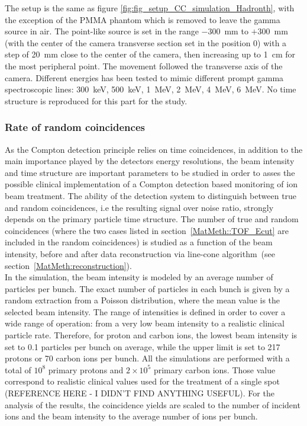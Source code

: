 The setup is the same as figure \ref{fig:fig_setup_CC_simulation_Hadronth}, with the exception of the PMMA phantom which is removed to leave the gamma source in air.
The point-like source is set in the range $-300$~mm to $+300$~mm (with the center of the camera transverse section set in the position 0) with a step of 20~mm close to the center of the camera, then increasing up to 1~cm for the most peripheral point. The movement followed the transverse axis of the camera. Different energies has been tested to mimic different prompt gamma spectroscopic lines: 300~keV, 500~keV, 1~MeV, 2~MeV, 4~MeV, 6~MeV. No time structure is reproduced for this part for the study.\newline

\subsubsection{Rate of random coincidences}

As the Compton detection principle relies on time coincidences, in addition to the main importance played by the detectors energy resolutions, the beam intensity and time structure are important parameters to be studied in order to asses the possible clinical implementation of a Compton detection based monitoring of ion beam treatment. The ability of the detection system to distinguish between true and random coincidences, i.e the resulting signal over noise ratio, strongly depends on the primary particle time structure. The number of true and random coincidences (where the two cases listed in section~\ref{MatMeth::TOF_Ecut} are included in the random coincidences) is studied as a function of the beam intensity, before and after data reconstruction via line-cone algorithm~(see section~\ref{MatMeth:reconstruction}).\\
In the simulation, the beam intensity is modeled by an average number of particles per bunch. The exact number of particles in each bunch is given by a random extraction from a Poisson distribution, where the mean value is the selected beam intensity. The range of intensities is defined in order to cover a wide range of operation: from a very low beam intensity to a realistic clinical particle rate. Therefore, for proton and carbon ions, the lowest beam intensity is set to 0.1 particles per bunch on average, while the upper limit is set to 217 protons or 70 carbon ions per bunch. All the simulations are performed with a total of $10^{8}$ primary protons and  $2\times10^{5}$ primary carbon ions. Those value correspond to realistic clinical values used for the treatment of a single spot (REFERENCE HERE - I DIDN'T FIND ANYTHING USEFUL). For the analysis of the results, the coincidence yields are scaled to the number of incident ions and the beam intensity to the average number of ions per bunch.

